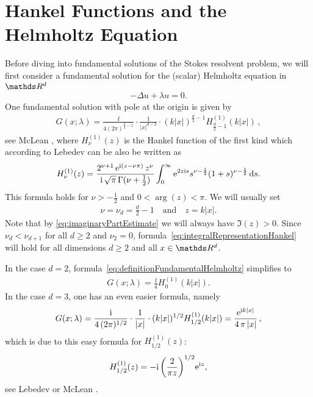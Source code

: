 \section{Hankel Functions and the Helmholtz Equation}
\label{sec:hankel}

Before diving into fundamental solutions of the Stokes resolvent problem, we will first consider a fundamental solution for the (scalar) Helmholtz equation in $\R^d$
\begin{align*}
-\Delta u + \lambda u = 0.
\end{align*}
One fundamental solution with pole at the origin is given by
\begin{align}
  \label{eq:definitionFundamentalHelmholtz}
  G(x; \lambda) = \frac{\ii}{4 ( 2\pi )^{\frac{d}{2} - 1}} \cdot \frac{1}{|x|^{d - 2}} \cdot (k |x|)^{\frac{d}{2} - 1} H_{\frac{d}{2} - 1}^{(1)} (k|x|)\,,
\end{align}
see McLean \cite[Eq.\@~9.14)]{mclean}, where $H_{\nu}^{(1)}(z)$ is the Hankel function of the first kind which according to Lebedev \cite[Sec.\@~5.11]{lebedev} can be also be written as
\begin{align}
  \label{eq:integralRepresentationHankel}
  H_\nu^{(1)}(z) = \frac{2^{\nu + 1} \, \mathrm{e}^{\mathrm{i}(z - \nu \pi)}\, z^\nu}{\mathrm{i}\, \sqrt{\pi}\, \Gamma(\nu + \frac{1}{2})} \int_0^\infty \mathrm{e}^{2 z \mathrm{i} s} s^{\nu - \frac{1}{2}} (1 + s)^{\nu - \frac{1}{2}} \, {\operatorname{d}\!{s}}.
\end{align}
This formula holds for $\nu > -\frac{1}{2}$ and $0 < \arg(z) < \pi$.
We will usually set 
\begin{align*}
  \nu = \nu_d = \frac{d}{2} - 1 \quad\text{and}\quad z = k|x|. 
\end{align*}
Note that by \eqref{eq:imaginaryPartEstimate} we will always have $\Im(z) > 0$. 
Since $\nu_d < \nu_{d + 1}$ for all $d \geq 2$ and $\nu_2 = 0$, formula~\eqref{eq:integralRepresentationHankel} will hold for all dimensions $d \geq 2$ and all $x \in \R^d$.

In the case $d = 2$, formula~\eqref{eq:definitionFundamentalHelmholtz} simplifies to 
\begin{align}
  \label{eq:2dDefinitionFundamentalHelmholtz}
  G(x;\lambda) = \frac{\ii}{4} H_{0}^{(1)}(k|x|).
\end{align}
In the case $d = 3$, one has an even easier formula, namely
\begin{align}
  \label{eq:3dDefinitionFundamentalHelmholtz}
  G(x; \lambda) = \frac{\mathrm{i}}{4\, (2\pi)^{1/2}} \cdot \frac{1}{|x|} \cdot (k |x|)^{1/2} H_{1/2}^{(1)}(k|x|) =  \frac{\mathrm{e}^{\mathrm{i} k |x|}}{4\, \pi\, |x|}\,,
\end{align}
which is due to this easy formula for $H_{1/2}^{(1)}(z)$:
\begin{align}
  \label{eq:Hankel3d}
  H_{1/2}^{(1)}(z) = -\mathrm{i}\, \bigg(\frac{2}{\pi z} \bigg)^{1/2} \mathrm{e}^{\mathrm{i} z},
\end{align}
see Lebedev \cite[Eq.\@~(5.8.4)]{lebedev} or McLean \cite[Eq.\@~(9.15)]{mclean}.

